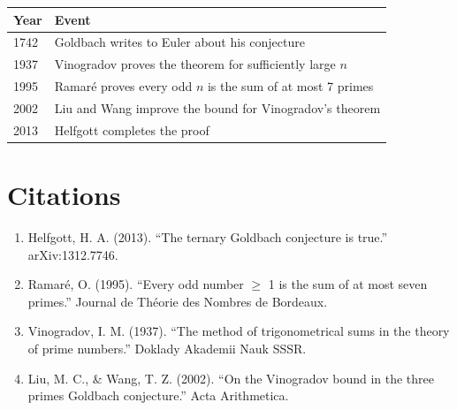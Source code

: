 \begin{tabularx}{\linewidth}{lX}
\toprule
\textbf{Year} & \textbf{Event} \\ \midrule
1742 & Goldbach writes to Euler about his conjecture \\ 
1937 & Vinogradov proves the theorem for sufficiently large $n$ \cite{vinogradov1937} \\ 
1995 & Ramaré proves every odd $n$ is the sum of at most 7 primes \cite{ramare1995} \\ 
2002 & Liu and Wang improve the bound for Vinogradov's theorem \cite{liu2002} \\ 
2013 & Helfgott completes the proof \cite{helfgott2013} \\ \bottomrule
\end{tabularx}

\section{Citations}

\begin{enumerate}
\item Helfgott, H. A. (2013). ``The ternary Goldbach conjecture is true.'' arXiv:1312.7746.
\item Ramaré, O. (1995). ``Every odd number $\geq$ 1 is the sum of at most seven primes.'' Journal de Théorie des Nombres de Bordeaux.
\item Vinogradov, I. M. (1937). ``The method of trigonometrical sums in the theory of prime numbers.'' Doklady Akademii Nauk SSSR.
\item Liu, M. C., \& Wang, T. Z. (2002). ``On the Vinogradov bound in the three primes Goldbach conjecture.'' Acta Arithmetica.
\end{enumerate}

